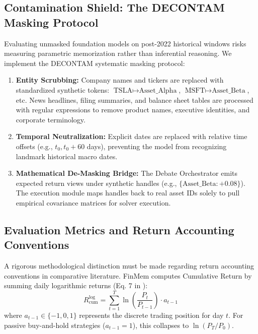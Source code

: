 \documentclass[conference]{IEEEtran}
\begin{document}
\subsection{Contamination Shield: The DECONTAM Masking Protocol}

Evaluating unmasked foundation models on post-2022 historical windows risks measuring parametric memorization rather than inferential reasoning. We implement the DECONTAM systematic masking protocol:
\begin{enumerate}
    \item \textbf{Entity Scrubbing:} Company names and tickers are replaced with standardized synthetic tokens: $\text{TSLA} \mapsto \text{Asset\_Alpha}$, $\text{MSFT} \mapsto \text{Asset\_Beta}$, etc. News headlines, filing summaries, and balance sheet tables are processed with regular expressions to remove product names, executive identities, and corporate terminology.
    \item \textbf{Temporal Neutralization:} Explicit dates are replaced with relative time offsets (e.g., $t_0, t_0 + 60$ days), preventing the model from recognizing landmark historical macro dates.
    \item \textbf{Mathematical De-Masking Bridge:} The Debate Orchestrator emits expected return views under synthetic handles (e.g., $\{\text{Asset\_Beta}: +0.08\}$). The execution module maps handles back to real asset IDs solely to pull empirical covariance matrices for solver execution.
\end{enumerate}

\subsection{Evaluation Metrics and Return Accounting Conventions}

A rigorous methodological distinction must be made regarding return accounting conventions in comparative literature. FinMem \cite{yu2023finmem} computes Cumulative Return by summing daily logarithmic returns (Eq. 7 in \cite{yu2023finmem}):
\begin{equation}
R_{\text{cum}}^{\text{log}} = \sum_{t=1}^T \ln\left(\frac{P_{t}}{P_{t-1}}\right) \cdot a_{t-1}
\label{eq:log_return}
\end{equation}
where $a_{t-1} \in \{-1, 0, 1\}$ represents the discrete trading position for day $t$. For passive buy-and-hold strategies ($a_{t-1}=1$), this collapses to $\ln(P_T / P_0)$.
\end{document}
